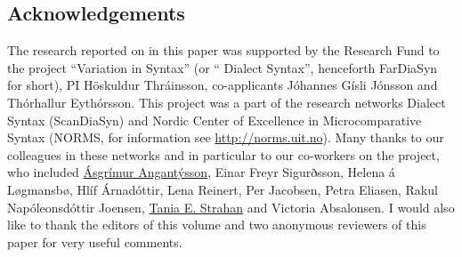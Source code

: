 \documentclass[output=paper]{LSP/langsci}
\begin{document}
\subsection*{Acknowledgements}
The research reported on in this paper was supported by the  Research Fund to the project “Variation in  Syntax” (or “ Dialect Syntax”, henceforth FarDiaSyn for short), PI Höskuldur Thráinsson, co-applicants Jóhannes Gísli Jónsson and Thórhallur Eythórsson. This project was a part of the  research networks  Dialect Syntax (ScanDiaSyn) and Nordic Center of Excellence in Microcomparative Syntax (NORMS, for information see \url{http://norms.uit.no}). Many thanks to our  colleagues in these networks and in particular to our co-workers on the  project, who included \href{http://malvis.hi.is/asgrimur_angantysson}{Ásgrímur Angantýsson}{,} Einar Freyr Sigurðsson, Helena á Løgmansbø, Hlíf Árnadóttir, Lena Reinert, Per Jacobsen, Petra Eliasen, Rakul Napóleonsdóttir Joensen, \href{http://malvis.hi.is/tania_strahan}{Tania E. Strahan}{ and} Victoria Absalonsen. I would also like to thank the editors of this volume and two anonymous reviewers of this paper for very useful comments.

\largerpage
{\sloppy
\printbibliography[heading=subbibliography,notkeyword=this]
}
\end{document}
